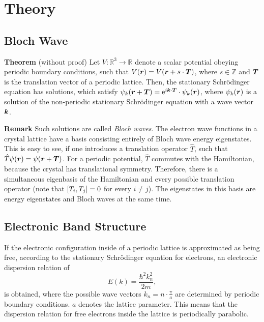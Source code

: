 \chapter{Theory}
\section{Bloch Wave}\label{sec:bloch}
\textbf{Theorem} (without proof) Let $V:\mathbb{R}^3\longrightarrow\mathbb{R}$ denote a scalar potential obeying periodic boundary conditions, such that $V(\boldsymbol{r}) = V(\boldsymbol{r}+s\cdot\boldsymbol{T})$, where $s\in\mathbb{Z}$ and $\boldsymbol{T}$ is the translation vector of a periodic lattice. Then, the stationary Schrödinger equation has solutions, which satisfy $\psi_k(\boldsymbol{r}+\boldsymbol{T}) = \mathrm{e}^{i\boldsymbol{k}\cdot\boldsymbol{T}}\cdot\psi_k(\boldsymbol{r})$, where $\psi_k(\boldsymbol{r})$ is a solution of the non-periodic stationary Schrödinger equation with a wave vector $\boldsymbol{k}$.

\textbf{Remark} Such solutions are called \textit{Bloch waves}. The electron wave functions in a crystal lattice have a basis consisting entirely of Bloch wave energy eigenstates. This is easy to see, if one introduces a translation operator $\hat{T}$, such that $\hat{T}\psi (\boldsymbol{r}) = \psi (\boldsymbol{r}+\boldsymbol{T})$. For a periodic potential, $\hat{T}$ commutes with the Hamiltonian, because the crystal has translational symmetry. Therefore, there is a simultaneous eigenbasis of the Hamiltonian and every possible translation operator (note that $\comm{T_i}{T_j} = 0$ for every $i\neq j$).
The eigenstates in this basis are energy eigenstates and Bloch waves at the same time.

\section{Electronic Band Structure}
If the electronic configuration inside of a periodic lattice is approximated as being free, according to the stationary Schrödinger equation for electrons, an electronic dispersion relation of
\begin{equation*}
	E(k) = \frac{\hbar^2 k_n^2}{2m},
\end{equation*}
is obtained, where the possible wave vectors $k_n = n\cdot\frac{\pi}{a}$ are determined by periodic boundary conditions.
$a$ denotes the lattice parameter.
This means that the dispersion relation for free electrons inside the lattice is periodically parabolic.

